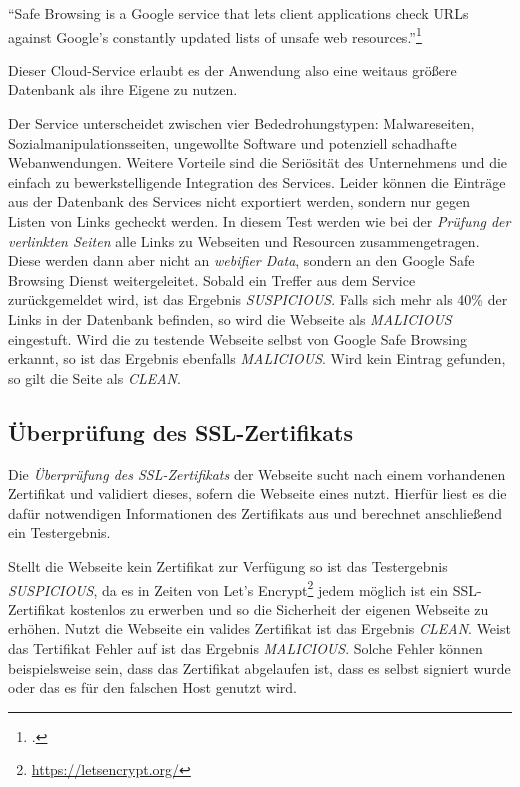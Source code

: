 \begin{center}
	\enquote{Safe Browsing is a Google service that lets client applications check \acsp{URL} against
	Google's constantly updated lists of unsafe web resources.}\footcite[Vgl.][]{googleSafeBrowsing}
\end{center}

Dieser Cloud-Service erlaubt es der Anwendung also eine weitaus größere Datenbank als ihre Eigene zu
nutzen.

Der Service unterscheidet zwischen vier Bededrohungstypen\label{par:konzep-gsb-types}: Malwareseiten, Sozialmanipulationsseiten, ungewollte Software und potenziell schadhafte Webanwendungen.
Weitere Vorteile sind die Seriösität des Unternehmens und die einfach zu bewerkstelligende
Integration des Services.
Leider können die Einträge aus der Datenbank des Services nicht exportiert werden, sondern nur gegen Listen von Links gecheckt werden.
In diesem Test werden wie bei der \textit{Prüfung der verlinkten Seiten} alle Links zu Webseiten und
Resourcen zusammengetragen.
Diese werden dann aber nicht an \textit{webifier Data}, sondern an den Google Safe Browsing Dienst
weitergeleitet.
Sobald ein Treffer aus dem Service zurückgemeldet wird, ist das Ergebnis \textit{SUSPICIOUS}.
Falls sich mehr als 40\% der Links in der Datenbank befinden, so wird die Webseite als
\textit{MALICIOUS} eingestuft.
Wird die zu testende Webseite selbst von Google Safe Browsing erkannt, so ist das Ergebnis ebenfalls
\textit{MALICIOUS}.
Wird kein Eintrag gefunden, so gilt die Seite als \textit{CLEAN}.

\subsection{Überprüfung des SSL-Zertifikats}

Die \textit{Überprüfung des SSL-Zertifikats} der Webseite sucht nach einem vorhandenen Zertifikat
und validiert dieses, sofern die Webseite eines nutzt. Hierfür liest es die dafür notwendigen
Informationen des Zertifikats aus und berechnet anschließend ein Testergebnis.

Stellt die Webseite kein Zertifikat zur Verfügung so ist das Testergebnis \textit{SUSPICIOUS}, da
es in Zeiten von Let's Encrypt\footnote{\url{https://letsencrypt.org/}} jedem möglich ist ein
\acs{SSL}-Zertifikat kostenlos zu erwerben und so die Sicherheit der eigenen Webseite zu erhöhen.
Nutzt die Webseite ein valides Zertifikat ist das Ergebnis \textit{CLEAN}. Weist das Tertifikat
Fehler auf ist das Ergebnis \textit{MALICIOUS}. Solche Fehler können beispielsweise sein, dass das
Zertifikat abgelaufen ist, dass es selbst signiert wurde oder das es für den falschen Host genutzt
wird.

